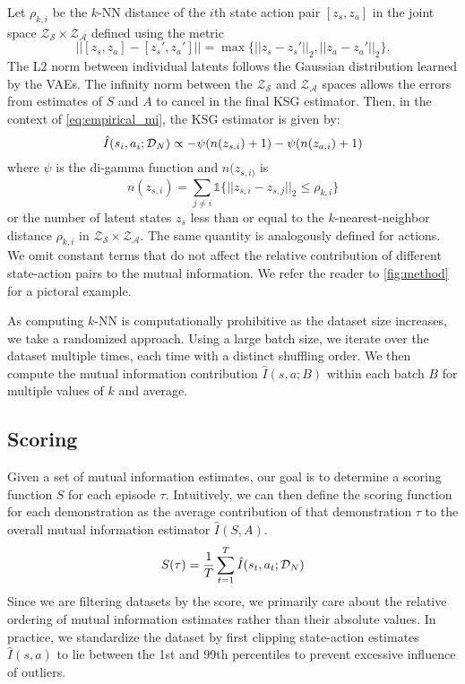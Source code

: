 Let $\rho_{k,i}$ be the $k$-NN distance of the $i$th state action pair $[z_s, z_a]$ in the joint space $\mathcal{Z}_\mathcal{S} \times \mathcal{Z}_\mathcal{A}$ defined using the metric
\begin{equation*}
    ||[z_s, z_a] - [z_s', z_a'] || = \max \{||z_s - z_s'||_2, ||z_a - z_a'||_2 \}.
\end{equation*}
The L2 norm between individual latents follows the Gaussian distribution learned by the VAEs. The infinity norm between the $\mathcal{Z}_\mathcal{S}$ and $\mathcal{Z}_\mathcal{A}$ spaces allows the errors from estimates of $S$ and $A$ to cancel in the final KSG estimator. Then, in the context of \cref{eq:empirical_mi}, the KSG estimator is given by:
\begin{equation*}
    \hat{I}(s_i, a_i ; \mathcal{D}_N) \propto -\psi(n(z_{s,i}) + 1) - \psi(n(z_{a,i}) + 1)
\end{equation*}
where $\psi$ is the di-gamma function and $n(z_{s,i)}$ is
\begin{equation*}
    n(z_{s,i}) = \sum_{j \ne i} \mathds{1}\{ ||z_{s,i} - z_{s,j}||_2 \leq \rho_{k,i} \}
\end{equation*}
or the number of latent states $z_s$ less than or equal to the $k$-nearest-neighbor distance $\rho_{k,i}$ in $\mathcal{Z}_\mathcal{S} \times \mathcal{Z}_\mathcal{A}$. The same quantity is analogously defined for actions. We omit constant terms that do not affect the relative contribution of different state-action pairs to the mutual information. We refer the reader to \cref{fig:method} for a pictoral example.

As computing $k$-NN is computationally prohibitive as the dataset size increases, we take a randomized approach. Using a large batch size, we iterate over the dataset multiple times, each time with a distinct shuffling order. We then compute the mutual information contribution $\hat{I}(s, a ; B)$ within each batch $B$ for multiple values of $k$ and average.



\subsection{Scoring}
Given a set of mutual information estimates, our goal is to determine a scoring function $S$ for each episode $\tau$. Intuitively, we can then define the scoring function for each demonstration as the average contribution of that demonstration $\tau$ to the overall mutual information estimator $\hat{I}(S,A)$. 
\begin{equation*}
    S(\tau) = \frac{1}{T} \sum_{t=1}^{T} \hat{I}(s_t, a_t ; \mathcal{D}_N)
\end{equation*}
Since we are filtering datasets by the score, we primarily care about the relative ordering of mutual information estimates rather than their absolute values. In practice, we standardize the dataset by first clipping state-action estimates $\hat{I}(s, a)$ to lie between the 1st and 99th percentiles to prevent excessive influence of outliers.

